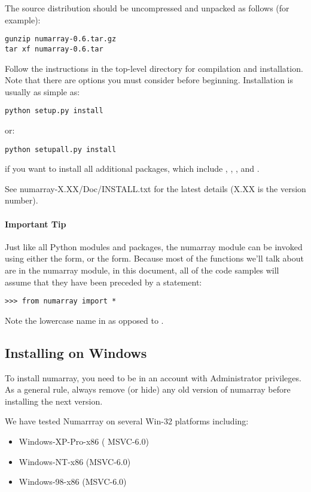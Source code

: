 The source distribution should be uncompressed and unpacked as follows (for
example):
\begin{verbatim}
gunzip numarray-0.6.tar.gz
tar xf numarray-0.6.tar
\end{verbatim}
Follow the instructions in the top-level directory for compilation and
installation. Note that there are options you must consider before beginning.
Installation is usually as simple as:
\begin{verbatim}
python setup.py install
\end{verbatim}
or:
\begin{verbatim}
python setupall.py install
\end{verbatim}
if you want to install all additional packages, which include
, ,
, and
.

See numarray-X.XX/Doc/INSTALL.txt for the latest details (X.XX is the version 
number).

\paragraph*{Important Tip} \label{sec:tip:from-numarray-import} Just like all
Python modules and packages, the numarray module can be invoked using either
the  form, or the  form.
Because most of the functions we'll talk about are in the numarray module, in
this document, all of the code samples will assume that they have been preceded
by a statement:
\begin{verbatim}
>>> from numarray import *
\end{verbatim}
Note the lowercase name in \module{\numarray} as opposed to \module{\numpy}.


\subsection{Installing on Windows}
\label{sec:installing-windows}

To install numarray, you need to be in an account with Administrator
privileges.  As a general rule, always remove (or hide) any old version of
numarray before installing the next version.

We have tested Numarrray on several Win-32 platforms including:
   
\begin{itemize}
\item Windows-XP-Pro-x86 ( MSVC-6.0) 
\item Windows-NT-x86 (MSVC-6.0) 
\item Windows-98-x86 (MSVC-6.0)
\end{itemize}

